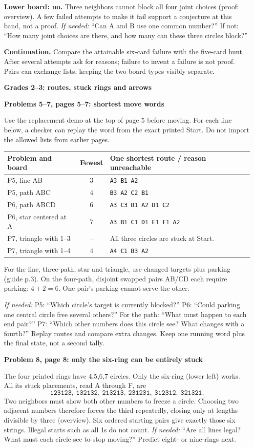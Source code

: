 \documentclass[10pt]{article}
\newcommand{\head}[1]{\par{\large\bfseries #1}\par}
\newcommand{\sub}[1]{\par\textbf{#1}\par}
\newcommand{\hint}[1]{\textit{If needed:} #1}
\newcommand{\word}[1]{\texttt{#1}}
\begin{document}
\textbf{Lower board: no.} Three neighbors cannot block all four joint choices (proof: overview). A few failed attempts to make it fail support a conjecture at this band, not a proof. \hint{``Can A and B use one common number?'' If not: ``How many joint choices are there, and how many can these three circles block?''}

\textbf{Continuation.} Compare the attainable six-card failure with the five-card hunt. After several attempts ask for reasons; failure to invent a failure is not proof. Pairs can exchange lists, keeping the two board types visibly separate.

\newpage
\head{Grades 2--3: routes, stuck rings and arrows}
\sub{Problems 5--7, pages 5--7: shortest move words}
Use the replacement demo at the top of page 5 before moving. For each line below, a checker can replay the word from the exact printed Start. Do not import the allowed lists from earlier pages.
\begin{center}\renewcommand{\arraystretch}{1.25}
\begin{tabular}{p{.30\linewidth}c p{.53\linewidth}}
Problem and board & Fewest & One shortest route / reason unreachable\\\midrule
P5, line AB & 3 & \word{A3 B1 A2}\\
P5, path ABC & 4 & \word{B3 A2 C2 B1}\\
P6, path ABCD & 6 & \word{A3 C3 B1 A2 D1 C2}\\
P6, star centered at A & 7 & \word{A3 B1 C1 D1 E1 F1 A2}\\
P7, triangle with 1--3 & -- & All three circles are stuck at Start.\\
P7, triangle with 1--4 & 4 & \word{A4 C1 B3 A2}\\
\end{tabular}\end{center}
For the line, three-path, star and triangle, use changed targets plus parking (guide p.3). On the four-path, disjoint swapped pairs AB/CD each require parking: $4+2=6$. One pair's parking cannot serve the other.

\hint{P5: ``Which circle's target is currently blocked?'' P6: ``Could parking one central circle free several others?'' For the path: ``What must happen to each end pair?'' P7: ``Which other numbers does this circle see? What changes with a fourth?''} Replay routes and compare extra changes. Keep one running word plus the final state, not a second tally.

\sub{Problem 8, page 8: only the six-ring can be entirely stuck}
The four printed rings have 4,5,6,7 circles. Only the six-ring (lower left) works. All its stuck placements, read A through F, are
\[
\word{123123},\ \word{132132},\ \word{213213},\ \word{231231},\ \word{312312},\ \word{321321}.
\]
Two neighbors must show both other numbers to freeze a circle. Choosing two adjacent numbers therefore forces the third repeatedly, closing only at lengths divisible by three (overview). Six ordered starting pairs give exactly those six strings. Illegal starts such as all 1s do not count. \hint{``Are all lines legal? What must each circle see to stop moving?''} Predict eight- or nine-rings next.
\end{document}
